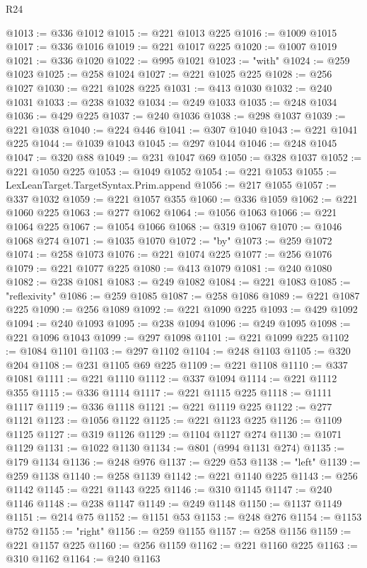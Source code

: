 \begin{lexlean}{R24}
\begin{coremodule}
@1013 := @336 @1012
@1015 := @221 @1013 @225
@1016 := @1009 @1015
@1017 := @336 @1016
@1019 := @221 @1017 @225
@1020 := @1007 @1019
@1021 := @336 @1020
@1022 := @995 @1021
@1023 := "with"
@1024 := @259 @1023
@1025 := @258 @1024
@1027 := @221 @1025 @225
@1028 := @256 @1027
@1030 := @221 @1028 @225
@1031 := @413 @1030
@1032 := @240 @1031
@1033 := @238 @1032
@1034 := @249 @1033
@1035 := @248 @1034
@1036 := @429 @225
@1037 := @240 @1036
@1038 := @298 @1037
@1039 := @221 @1038
@1040 := @224 @446
@1041 := @307 @1040
@1043 := @221 @1041 @225
@1044 := @1039 @1043
@1045 := @297 @1044
@1046 := @248 @1045
@1047 := @320 @88
@1049 := @231 @1047 @69
@1050 := @328 @1037
@1052 := @221 @1050 @225
@1053 := @1049 @1052
@1054 := @221 @1053
@1055 := LexLeanTarget.TargetSyntax.Prim.append
@1056 := @217 @1055
@1057 := @337 @1032
@1059 := @221 @1057 @355
@1060 := @336 @1059
@1062 := @221 @1060 @225
@1063 := @277 @1062
@1064 := @1056 @1063
@1066 := @221 @1064 @225
@1067 := @1054 @1066
@1068 := @319 @1067
@1070 := @1046 @1068 @274
@1071 := @1035 @1070
@1072 := "by"
@1073 := @259 @1072
@1074 := @258 @1073
@1076 := @221 @1074 @225
@1077 := @256 @1076
@1079 := @221 @1077 @225
@1080 := @413 @1079
@1081 := @240 @1080
@1082 := @238 @1081
@1083 := @249 @1082
@1084 := @221 @1083
@1085 := "reflexivity"
@1086 := @259 @1085
@1087 := @258 @1086
@1089 := @221 @1087 @225
@1090 := @256 @1089
@1092 := @221 @1090 @225
@1093 := @429 @1092
@1094 := @240 @1093
@1095 := @238 @1094
@1096 := @249 @1095
@1098 := @221 @1096 @1043
@1099 := @297 @1098
@1101 := @221 @1099 @225
@1102 := @1084 @1101
@1103 := @297 @1102
@1104 := @248 @1103
@1105 := @320 @204
@1108 := @231 @1105 @69 @225
@1109 := @221 @1108
@1110 := @337 @1081
@1111 := @221 @1110
@1112 := @337 @1094
@1114 := @221 @1112 @355
@1115 := @336 @1114
@1117 := @221 @1115 @225
@1118 := @1111 @1117
@1119 := @336 @1118
@1121 := @221 @1119 @225
@1122 := @277 @1121
@1123 := @1056 @1122
@1125 := @221 @1123 @225
@1126 := @1109 @1125
@1127 := @319 @1126
@1129 := @1104 @1127 @274
@1130 := @1071 @1129
@1131 := @1022 @1130
@1134 := @801 (@994 @1131 @274)
@1135 := @179 @1134
@1136 := @248 @976
@1137 := @229 @53
@1138 := "left"
@1139 := @259 @1138
@1140 := @258 @1139
@1142 := @221 @1140 @225
@1143 := @256 @1142
@1145 := @221 @1143 @225
@1146 := @310 @1145
@1147 := @240 @1146
@1148 := @238 @1147
@1149 := @249 @1148
@1150 := @1137 @1149
@1151 := @214 @75
@1152 := @1151 @53
@1153 := @248 @276
@1154 := @1153 @752
@1155 := "right"
@1156 := @259 @1155
@1157 := @258 @1156
@1159 := @221 @1157 @225
@1160 := @256 @1159
@1162 := @221 @1160 @225
@1163 := @310 @1162
@1164 := @240 @1163

\end{coremodule}
\end{lexlean}
